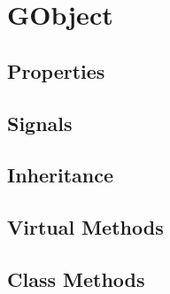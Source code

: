 \chapter{GObject}

\section{Properties}
\section{Signals}

\section{Inheritance}
\section{Virtual Methods}
\section{Class Methods}
